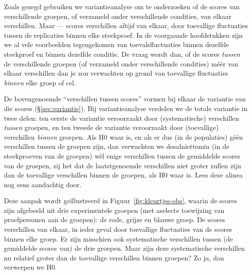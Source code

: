 \documentclass[
]{book}
\begin{document}
Zoals gezegd gebruiken we variantieanalyse om te onderzoeken of de
scores van verschillende groepen, of verzameld onder verschillende
condities, van elkaar verschillen. Maar --- scores verschillen \emph{altijd}
van elkaar, door toevallige fluctuaties tussen de replicaties binnen
elke steekproef. In de voorgaande hoofdstukken zijn we al vele
voorbeelden tegengekomen van toevalsfluctuaties binnen dezelfde
steekproef en binnen dezelfde conditie. De vraag wordt dan, of de scores
\emph{tussen} de verschillende groepen (of verzameld onder verschillende
condities) méér van elkaar verschillen dan je zou verwachten op grond
van toevallige fluctuaties \emph{binnen} elke groep of cel.

De bovengenoemde ``verschillen tussen scores'' vormen bij elkaar de
variantie van die scores
(§\ref{sec:variantie}). Bij variantieanalyse verdelen we de totale
variantie in twee delen: ten eerste de variantie veroorzaakt door
(systematische) verschillen \emph{tussen} groepen, en ten tweede de variantie
veroorzaakt door (toevallige) verschillen \emph{binnen} groepen. Als H0 waar
is, en als er dus (in de populaties) géén verschillen tussen de groepen
zijn, dan verwachten we desalniettemin (in de steekproeven van de
groepen) wèl enige verschillen tussen de gemiddelde scores van de
groepen, zij het dat de laatstgenoemde verschillen niet groter zullen
zijn dan de toevallige verschillen binnen de groepen, als H0 waar is.
Lees deze alinea nog eens aandachtig door.

Deze aanpak wordt geïllustreerd in
Figuur~\ref{fig:kleurtjes-obs}, waarin de scores zijn afgebeeld uit drie
experimentele groepen (met aselecte toewijzing van proefpersonen aan de
groepen): de rode, grijze en blauwe groep. De scores verschillen van
elkaar, in ieder geval door toevallige fluctuaties van de scores binnen
elke groep. Er zijn misschien ook systematische verschillen tussen (de
gemiddelde scores van) de drie groepen. Maar zijn deze systematische
verschillen nu relatief groter dan de toevallige verschillen binnen
groepen? Zo ja, dan verwerpen we H0.
\end{document}
